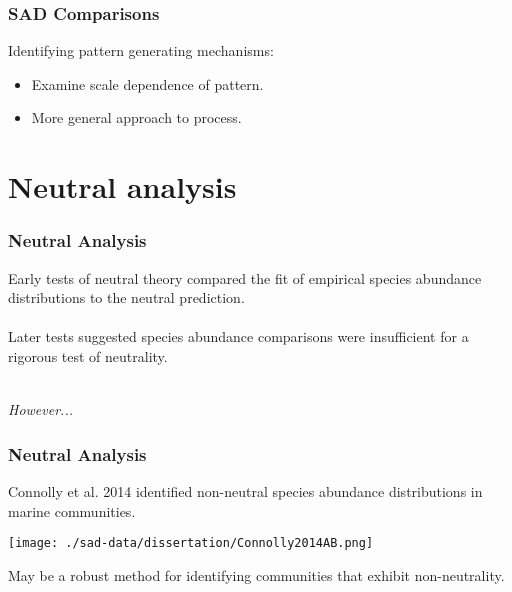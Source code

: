 \documentclass[14pt]{beamer}
\begin{document}
\begin{frame}[t]
\frametitle{SAD Comparisons}
Identifying pattern generating mechanisms:
\begin{itemize}
\item Examine scale dependence of pattern.
\item More general approach to process.
\end{itemize}
\end{frame}

\section{Neutral analysis}
\begin{frame}
\frametitle{Neutral Analysis}
Early tests of neutral theory compared the fit of empirical species abundance distributions to the neutral prediction.\\
~\\
Later tests suggested species abundance comparisons were insufficient for a rigorous test of neutrality.\\
~\\
\begin{Large}
\emph{However...}
\end{Large}
\end{frame}

\begin{frame}
\frametitle{Neutral Analysis}
Connolly et al. 2014 identified non-neutral species abundance distributions in marine communities.\\
\begin{center}
\texttt{[image: ./sad-data/dissertation/Connolly2014AB.png]}
\end{center}
May be a robust method for identifying communities that exhibit non-neutrality.\\
\end{frame}
\end{document}
